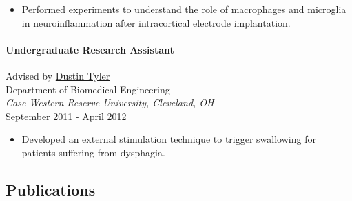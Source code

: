 \documentclass[
  letterpaper,
  DIV=11,
  numbers=noendperiod]{scrartcl}
\let\oldparagraph\paragraph
\renewcommand{\paragraph}[1]{\oldparagraph{#1}\mbox{}}
\providecommand{\tightlist}{%
  \setlength{\itemsep}{0pt}\setlength{\parskip}{0pt}}\usepackage{longtable,booktabs,array}
\begin{document}
\begin{itemize}
\tightlist
\item
  Performed experiments to understand the role of macrophages and
  microglia in neuroinflammation after intracortical electrode
  implantation.
\end{itemize}

\hypertarget{undergraduate-research-assistant-2}{%
\paragraph{Undergraduate Research
Assistant}\label{undergraduate-research-assistant-2}}

Advised by \href{https://engineering.case.edu/ebme/tyler}{Dustin
Tyler}\\
Department of Biomedical Engineering\\
\emph{Case Western Reserve University, Cleveland, OH}\\
September 2011 - April 2012

\begin{itemize}
\tightlist
\item
  Developed an external stimulation technique to trigger swallowing for
  patients suffering from dysphagia.
\end{itemize}

\hypertarget{publications}{%
\subsection{Publications}\label{publications}}
\end{document}

